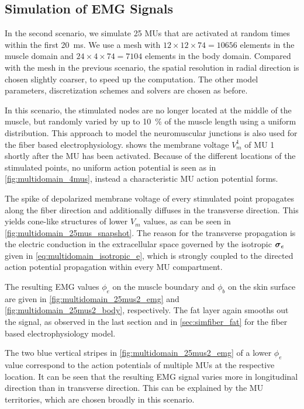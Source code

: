 \subsection{Simulation of EMG Signals}\label{sec:multidomain_simulation_emg}

In the second scenario, we simulate 25 MUs that are activated at random times within the first \SI{20}{\ms}. We use a mesh with $12 \times 12 \times 74 = \num{10656}$ elements in the muscle domain and $24 \times 4 \times 74 = 7104$ elements in the body domain. Compared with the mesh in the previous scenario, the spatial resolution in radial direction is chosen slightly coarser, to speed up the computation.
The other model parameters, discretization schemes and solvers are chosen as before.

In this scenario, the stimulated nodes are no longer located at the middle of the muscle, but randomly varied by up to \SI{10}{\percent} of the muscle length using a uniform distribution. This approach to model the neuromuscular junctions is also used for the fiber based electrophysiology. 
 shows the membrane voltage $V_m^1$ of MU 1 shortly after the MU has been activated. Because of the different locations of the stimulated points, no uniform action potential  is seen as in \cref{fig:multidomain_4mus}, instead a characteristic MU action potential forms. 

The spike of depolarized membrane voltage of every stimulated point propagates along the fiber direction and additionally diffuses in the transverse direction. This yields cone-like structures of lower $V_m$ values, as can be seen in \cref{fig:multidomain_25mus_snapshot}. The reason for the transverse propagation is the electric conduction in the extracellular space governed by the isotropic $\boldsymbol{\sigma}_e$ given in \cref{eq:multidomain_isotropic_e}, which is strongly coupled to the directed action potential propagation within every MU compartment.

The resulting EMG values $\phi_e$ on the muscle boundary and $\phi_b$ on the skin surface are given in \cref{fig:multidomain_25mus2_emg} and \cref{fig:multidomain_25mus2_body}, respectively. The fat layer again smooths out the signal, as observed in the last section and in \cref{sec:simfiber_fat} for the fiber based electrophysiology model.

The two blue vertical stripes in \cref{fig:multidomain_25mus2_emg} of a lower $\phi_e$ value correspond to the action potentials of multiple MUs at the respective location. It can be seen that the resulting EMG signal varies more in longitudinal direction than in transverse direction. This can be explained by the MU territories, which are chosen broadly in this scenario.

